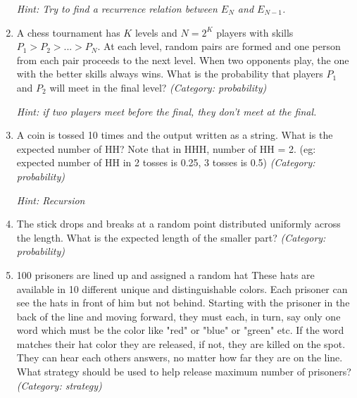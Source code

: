 \begin{enumerate}
\small\emph{Hint: Try to find a recurrence relation between $E_{N}$ and $E_{N-1}$.}





\item A chess tournament has $K$ levels and $N = 2^K$ players with skills $P_1 > P_2 > ... >P_{N}$. At each level, random pairs are formed and one person from each pair proceeds to the next level. When two opponents play, the one with the better skills always wins. What is the probability that players $P_1$ and $P_2$ will meet in the final level?
\small\emph{(Category: probability)}

\small\emph{Hint: if two players meet before the final, they don't meet at the final.}





\item A coin is tossed 10 times and the output written as a string. What is the expected number of HH? Note that in HHH, number of HH = 2. (eg: expected number of HH in 2 tosses is 0.25, 3 tosses is 0.5)
\small\emph{(Category: probability)}

\small\emph{Hint: Recursion}





\item The stick drops and breaks at a random point distributed uniformly across the length. What is the expected length of the smaller part?
\small\emph{(Category: probability)}




\item 100 prisoners are lined up and assigned a random hat These hats are available in 10 different unique and distinguishable colors. Each prisoner can see the hats in front of him but not behind. Starting with the prisoner in the back of the line and moving forward, they must each, in turn, say only one word which must be the color like "red" or "blue" or "green" etc. If the word matches their hat color they are released, if not, they are killed on the spot. They can hear each others answers, no matter how far they are on the line. What strategy should be used to help release maximum number of prisoners?
\small\emph{(Category: strategy)}


\end{enumerate}
